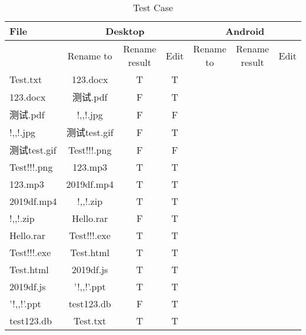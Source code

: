 \begin{table}[H]
\caption{Test Case}
\centering
\begin{tabular}{|p{2.5cm}|c|c|c|c|c|c|}
\hline
File & \multicolumn{3}{|c|}{Desktop} &\multicolumn{3}{|c|}{Android} \\
\hline
& Rename to & Rename result & Edit & Rename to & Rename result & Edit  \\
\hline
Test.txt & 123.docx & T & T\\
\hline
123.docx & 测试.pdf& F & T\\
\hline
测试.pdf& !,,!.jpg & F & F\\
\hline
!,,!.jpg & 测试test.gif & F & T\\
\hline
测试test.gif& Test!!!.png & F & F\\
\hline
Test!!!.png & 123.mp3 & T & T\\
\hline
123.mp3& 2019df.mp4 & T & T\\
\hline
2019df.mp4 & !,,!.zip  & T & T\\
\hline
!,,!.zip  & Hello.rar & F & T\\
\hline
Hello.rar& Test!!!.exe & T & T\\
\hline
Test!!!.exe & Test.html & T & T\\
\hline
Test.html& 2019df.js & T & T\\
\hline
2019df.js& '!,,!'.ppt & T & T\\
\hline
'!,,!'.ppt & test123.db & F & T\\
\hline
test123.db & Test.txt & T & T\\
\hline
\bottomrule
\end{tabular}
\end{table}
